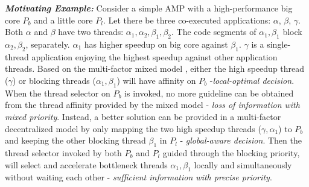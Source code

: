 \documentclass[sigplan,review,anonymous]{acmart}\settopmatter{printfolios=true,printccs=false,printacmref=false}
\begin{document}
\textbf{\textit{Motivating Example:}} Consider a simple AMP with a high-performance big core $P_b$ and a little core $P_l$. 
Let there be three co-executed applications: {$\alpha$, $\beta$, $\gamma$}. Both $\alpha$ and $\beta$ have two threads: $\alpha_1, \alpha_2, \beta_1, \beta_2$. The code segments of $\alpha_1, \beta_1$ block $\alpha_2, \beta_2$, separately. $\alpha_1$ has higher speedup on big core against $\beta_1$.  $\gamma$ is a single-thread application enjoying the highest speedup against other application threads. 
Based on the multi-factor mixed model \cite{jibaja2016portable}, either the high speedup thread ($\gamma$) or blocking threads ($\alpha_1,\beta_1$) will have affinity on $P_b$ -{\it local-optimal decision}. When the thread selector on $P_b$ is invoked, no more guideline can be obtained from the thread affinity provided by the mixed model - {\it loss of information with mixed priority}. Instead, a better solution can be provided in a multi-factor decentralized model by only mapping the two high speedup threads ($\gamma,\alpha_1$) to $P_b$ and keeping the other blocking thread $\beta_1$ in $P_l$ - {\it global-aware decision}. Then the thread selector invoked by both $P_b$ and $P_l$ guided through the blocking priority, will select and accelerate bottleneck threads $\alpha_1,\beta_1$ locally and simultaneously without waiting each other - {\it sufficient information with precise priority}.  

\end{document}
